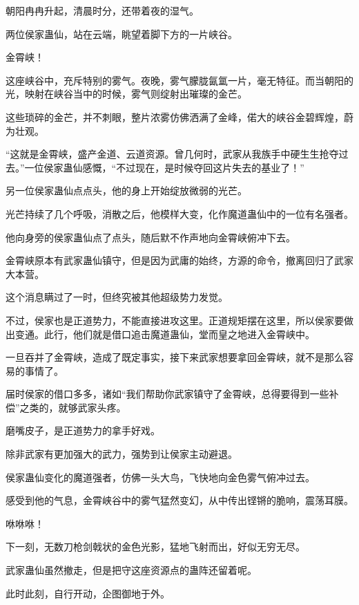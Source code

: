 
\begin{this_body}

朝阳冉冉升起，清晨时分，还带着夜的湿气。

两位侯家蛊仙，站在云端，眺望着脚下方的一片峡谷。

金霄峡！

这座峡谷中，充斥特别的雾气。夜晚，雾气朦胧氤氲一片，毫无特征。而当朝阳的光，映射在峡谷当中的时候，雾气则绽射出璀璨的金芒。

这些琐碎的金芒，并不刺眼，整片浓雾仿佛洒满了金峰，偌大的峡谷金碧辉煌，蔚为壮观。

“这就是金霄峡，盛产金道、云道资源。曾几何时，武家从我族手中硬生生抢夺过去。”一位侯家蛊仙感慨，“不过现在，是时候夺回这片失去的基业了！”

另一位侯家蛊仙点点头，他的身上开始绽放微弱的光芒。

光芒持续了几个呼吸，消散之后，他模样大变，化作魔道蛊仙中的一位有名强者。

他向身旁的侯家蛊仙点了点头，随后默不作声地向金霄峡俯冲下去。

金霄峡原本有武家蛊仙镇守，但是因为武庸的始终，方源的命令，撤离回归了武家大本营。

这个消息瞒过了一时，但终究被其他超级势力发觉。

不过，侯家也是正道势力，不能直接进攻这里。正道规矩摆在这里，所以侯家要做出变通。此行，他们就是借口追击魔道蛊仙，堂而皇之地进入金霄峡中。

一旦吞并了金霄峡，造成了既定事实，接下来武家想要拿回金霄峡，就不是那么容易的事情了。

届时侯家的借口多多，诸如“我们帮助你武家镇守了金霄峡，总得要得到一些补偿”之类的，就够武家头疼。

磨嘴皮子，是正道势力的拿手好戏。

除非武家有更加强大的武力，强势到让侯家主动避退。

侯家蛊仙变化的魔道强者，仿佛一头大鸟，飞快地向金色雾气俯冲过去。

感受到他的气息，金霄峡谷中的雾气猛然变幻，从中传出铿锵的脆响，震荡耳膜。

咻咻咻！

下一刻，无数刀枪剑戟状的金色光影，猛地飞射而出，好似无穷无尽。

武家蛊仙虽然撤走，但是把守这座资源点的蛊阵还留着呢。

此时此刻，自行开动，企图御地于外。


\end{this_body}
